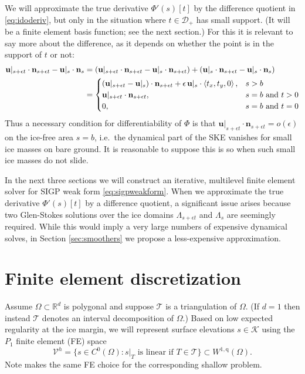 \documentclass[letterpaper,final,12pt,reqno]{amsart}
\theoremstyle{claim}
\newcommand{\eps}{\epsilon}
\newcommand{\RR}{\mathbb{R}}
\newcommand{\bn}{\mathbf{n}}
\newcommand{\bu}{\mathbf{u}}
\newcommand{\qq}{{\text{q}}}
\numberwithin{equation}{section}
\numberwithin{figure}{section}
\numberwithin{table}{section}
\numberwithin{theorem}{section}
\begin{document}
We will approximate the true derivative $\Phi'(s)[t]$ by the difference quotient in \eqref{eq:idoderiv}, but only in the situation where $t \in \mathcal{D}_+$ has small support.  (It will be a finite element basis function; see the next section.)  For this it is relevant to say more about the difference, as it depends on whether the point is in the support of $t$ or not:
\begin{align}
\bu|_{s+\eps t} \cdot \bn_{s+\eps t} - \bus \cdot \bn_s &= \left(\bu|_{s+\eps t} \cdot \bn_{s+\eps t} - \bus \cdot \bn_{s+\eps t}\right) + \left(\bus \cdot \bn_{s+\eps t} - \bus \cdot \bn_s\right) \label{eq:differencecases} \\
    &= \begin{cases}
           (\bu|_{s+\eps t} - \bus) \cdot \bn_{s+\eps t} + \eps\, \bus \cdot \left<t_x,t_y,0\right>, & s > b \\
           \bu|_{s+\eps t} \cdot \bn_{s+\eps t}, & s=b \text{ and } t > 0 \\
           0, & s=b \text{ and } t = 0
                 \end{cases} \notag
\end{align}
Thus a necessary condition for differentiability of $\Phi$ is that $\bu|_{s+\eps t} \cdot \bn_{s+\eps t} = o(\eps)$ on the ice-free area $s=b$, i.e.~the dynamical part of the SKE vanishes for small ice masses on bare ground.  It is reasonable to suppose this is so when such small ice masses do not slide.

In the next three sections we will construct an iterative, multilevel finite element solver for SIGP weak form \eqref{eq:sigpweakform}.  When we approximate the true derivative $\Phi'(s)[t]$ by a difference quotient, a significant issue arises because two Glen-Stokes solutions over the ice domains $\Lambda_{s+\eps t}$ and $\Lambda_s$ are seemingly required.  While this would imply a very large numbers of expensive dynamical solves, in Section \ref{sec:smoothers} we propose a less-expensive approximation.


\section{Finite element discretization} \label{sec:fe}

Assume $\Omega \subset \RR^d$ is polygonal and suppose $\mathcal{T}$ is a triangulation of $\Omega$.  (If $d=1$ then instead $\mathcal{T}$ denotes an interval decomposition of $\Omega$.)  Based on low expected regularity at the ice margin, we will represent surface elevations $s\in \mathcal{K}$ using the $P_1$ finite element (FE) space
\begin{equation}
\mathcal{V}^h = \{s \in C^0(\Omega) : s|_T \text{ is linear if } T \in \mathcal{T}\} \subset W^{1,\qq}(\Omega).
\end{equation}
Note \cite{JouvetBueler2012} makes the same FE choice for the corresponding shallow problem.
\end{document}
